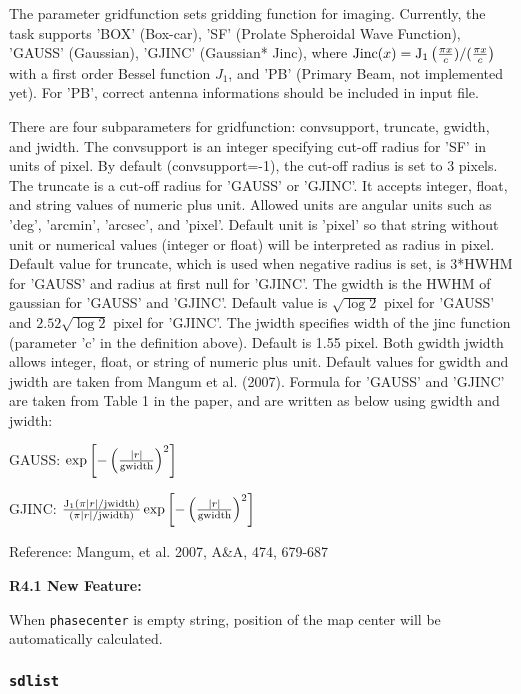 The parameter gridfunction sets gridding function for imaging. 
Currently, the task supports 'BOX' (Box-car), 'SF' (Prolate 
Spheroidal Wave Function), 'GAUSS' (Gaussian), 'GJINC' (Gaussian*
Jinc), where 
${\rm Jinc}(x) = {\rm J}_1 \left( \frac{\pi x}{c})/(\frac{\pi x}{c} \right)$ 
with a first order 
Bessel function $J_1$, and 'PB' (Primary Beam, not implemented yet). 
For 'PB', correct antenna informations should be included in input 
file. 

There are four subparameters for gridfunction: convsupport, truncate, 
gwidth, and jwidth. The convsupport is an integer specifying cut-off 
radius for 'SF' in units of pixel. By default (convsupport=-1), 
the cut-off radius is set to 3 pixels. The truncate is a cut-off 
radius for 'GAUSS' or 'GJINC'. It accepts integer, float, and 
string values of numeric plus unit. Allowed units are angular 
units such as 'deg', 'arcmin', 'arcsec', and 'pixel'. Default unit 
is 'pixel' so that string without unit or numerical values (integer 
or float) will be interpreted as radius in pixel. Default value 
for truncate, which is used when negative radius is set, is 3*HWHM 
for 'GAUSS' and radius at first null for 'GJINC'. The gwidth is 
the HWHM of gaussian for 'GAUSS' and 'GJINC'. Default value is 
$\sqrt{\log 2}$ pixel for 'GAUSS' and $2.52 \sqrt{\log 2}$ pixel for 
'GJINC'. The jwidth specifies width of the jinc function (parameter 
'c' in the definition above). Default is 1.55 pixel. Both gwidth 
jwidth allows integer, float, or string of numeric plus unit. 
Default values for gwidth and jwidth are taken from Mangum et al. 
(2007). Formula for 'GAUSS' and 'GJINC' are taken from Table 1 in 
the paper, and are written as below using gwidth and jwidth: 

   GAUSS: $ \exp \left[ - \left( \frac{|r|}{\rm gwidth} \right)^2 \right] $

   GJINC: $ \frac{ {\rm J}_1 \left( \pi |r| / {\rm jwidth} \right)}{\left( \pi |r| / {\rm jwidth} \right)} \exp \left[ - \left( \frac{|r|}{\rm gwidth} \right)^2 \right] $  

Reference: Mangum, et al. 2007, A\&A, 474, 679-687 

\medskip
{\bf R4.1 New Feature:}

When {\tt phasecenter} is empty string, position of the map center 
will be automatically calculated.
 

\subsubsection{{\tt sdlist}}
\label{section:sd.sdtasks.tasks.sdlist}

